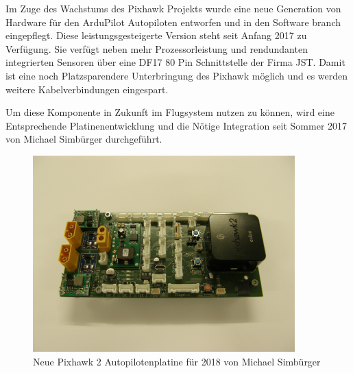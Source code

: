 Im Zuge des Wachstums des Pixhawk Projekts wurde eine neue Generation von Hardware für den ArduPilot Autopiloten entworfen und in den Software branch eingepflegt. Diese leistungsgesteigerte Version steht seit Anfang 2017 zu Verfügung.
Sie verfügt neben mehr Prozessorleistung und rendundanten integrierten Sensoren über eine DF17 80 Pin Schnittstelle der Firma JST. Damit ist eine noch Platzsparendere Unterbringung des Pixhawk möglich und es werden weitere Kabelverbindungen eingespart.

Um diese Komponente in Zukunft im Flugsystem nutzen zu können, wird eine Entsprechende Platinenentwicklung und die Nötige Integration seit Sommer 2017 von Michael Simbürger durchgeführt.

\begin{figure}[H]
\centering
\includegraphics[width=0.9\textwidth]{bilder/Fotos/Pixhawk2_Autopilot_PCB_2018_Simbuerger.jpg} 
\caption{Neue Pixhawk 2 Autopilotenplatine für 2018 von Michael Simbürger} 
\label{fig:Neue Pixhawk 2 Autopilotenplatine für 2018 von Michael Simbürger}
\end{figure}




